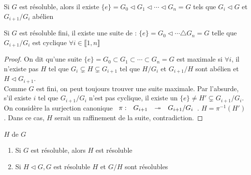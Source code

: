\documentclass[]{report}
\begin{document}
    \begin{cor}{}{}
        Si $G$ est résoluble, alors il existe $\{e\}=G_0\triangleleft G_1\triangleleft \cdots\triangleleft G_n=G$ tels que $G_i\triangleleft G$ et $G_{i+1}/G_i$ abélien
    \end{cor}

    \begin{cor}{}{}
        Si $G$ est résoluble fini, il existe une suite de \sgs: $\{e\}=G_0\triangleleft\cdots\triangle G_n=G$ telle que $G_{i+1}/G_i$ est cyclique $\forall i\in\llbracket 1,n\rrbracket$
    \end{cor}

    \begin{proof}
        On dit qu'une suite $\{e\}=G_0\subset G_1\subset \cdots\subset G_n=G$ est maximale si $\forall i$, il n'existe pas $H$ tel que $G_i\subsetneq H\subsetneq G_{i+1}$ tel que $H/G_i$ et $G_{i+1}/H$ sont abélien et $H\triangleleft G_{i+1}$.\\
        Comme $G$ est fini, on peut toujours trouver une suite maximale. Par l'absurde, s'il existe $i$ tel que $G_{i+1}/G_i$ n'est pas cyclique, il existe un \sg $\{e\}\neq H'\subsetneq G_{i+1}/G_i$.
        On considère la surjection canonique $\begin{array}{ccccc} \pi : & G_{i+1} & \twoheadrightarrow & G_{i+1}/G_i \end{array}$. $H=\pi^{-1}(H')$. Dans ce cas, $H$ serait un raffinement de la suite, contradiction.
    \end{proof}

    \begin{prop}{}{}
        $H$ \sg de $G$
        \begin{enumerate}
            \item Si $G$ est résoluble, alors $H$ est résoluble
            \item Si $H\triangleleft G,G$ est résoluble \ssi $H$ et $G/H$ sont résolubles
        \end{enumerate}
    \end{prop}
\end{document}
